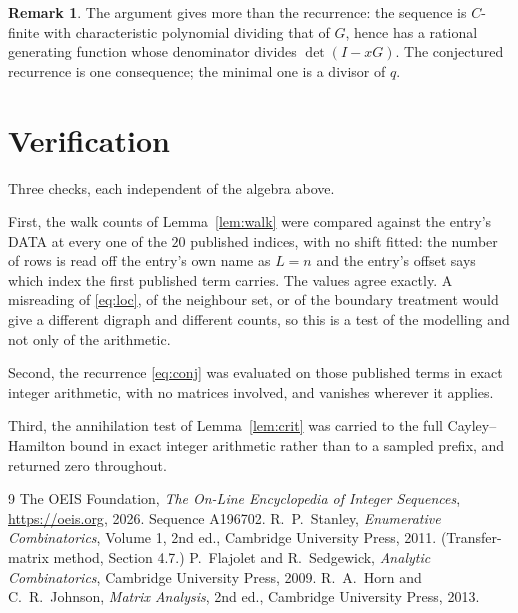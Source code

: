 \documentclass[11pt,a4paper]{article}
\theoremstyle{plain}
\theoremstyle{definition}
\newtheorem{remark}[theorem]{Remark}
\begin{document}
\begin{remark}
The argument gives more than the recurrence: the sequence is $C$-finite with characteristic
polynomial dividing that of $G$, hence has a rational generating function whose denominator
divides $\det(I-xG)$. The conjectured recurrence is one consequence; the minimal one is a
divisor of $q$.
\end{remark}

\section{Verification}

Three checks, each independent of the algebra above.

First, the walk counts of Lemma~\ref{lem:walk} were compared against the entry's DATA at
every one of the $20$ published indices, with no shift fitted: the number of rows is
read off the entry's own name as $L=n$ and the entry's offset says which index the first
published term carries. The values agree exactly. A misreading of \eqref{eq:loc}, of the
neighbour set, or of the boundary treatment would give a different digraph and different
counts, so this is a test of the modelling and not only of the arithmetic.

Second, the recurrence \eqref{eq:conj} was evaluated on those published terms in exact
integer arithmetic, with no matrices involved, and vanishes wherever it applies.

Third, the annihilation test of Lemma~\ref{lem:crit} was carried to the full
Cayley--Hamilton bound in exact integer arithmetic rather than to a sampled prefix, and
returned zero throughout.

\begin{thebibliography}{9}
 The OEIS Foundation, \emph{The On-Line Encyclopedia of Integer
Sequences}, \url{https://oeis.org}, 2026. Sequence A196702.
 R.~P.~Stanley, \emph{Enumerative Combinatorics}, Volume 1, 2nd ed.,
Cambridge University Press, 2011. (Transfer-matrix method, Section 4.7.)
 P.~Flajolet and R.~Sedgewick, \emph{Analytic Combinatorics}, Cambridge
University Press, 2009.
 R.~A.~Horn and C.~R.~Johnson, \emph{Matrix Analysis}, 2nd ed., Cambridge
University Press, 2013.
\end{thebibliography}
\end{document}
